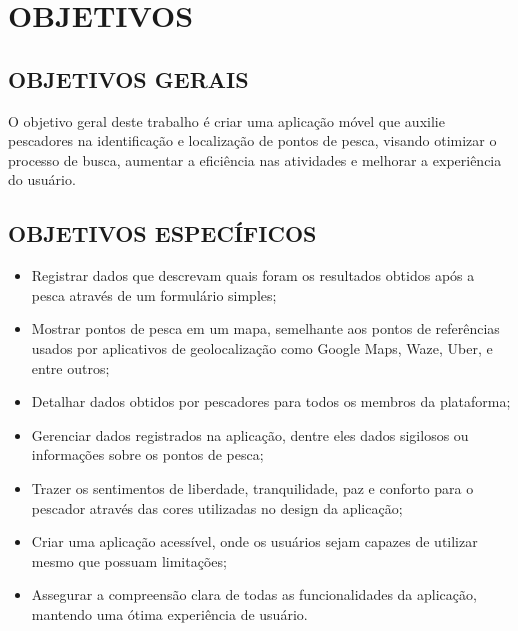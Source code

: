 
\chapter{OBJETIVOS}
\label{chap:objetivos}

\section{OBJETIVOS GERAIS}
\label{sec:objetivosGerais}

O objetivo geral deste trabalho é criar uma aplicação móvel que auxilie pescadores na identificação e localização de pontos de pesca, visando otimizar o processo de busca, aumentar a eficiência nas atividades e melhorar a experiência do usuário.

\section{OBJETIVOS ESPECÍFICOS}
\label{sec:objetivosEspecificos}

\begin{itemize}
  \item Registrar dados que descrevam quais foram os resultados obtidos após a pesca através de um formulário simples;
  \item Mostrar pontos de pesca em um mapa, semelhante aos pontos de referências usados por aplicativos de geolocalização como Google Maps, Waze, Uber, e entre outros;
  \item Detalhar dados obtidos por pescadores para todos os membros da plataforma;
  \item Gerenciar dados registrados na aplicação, dentre eles dados sigilosos ou informações sobre os pontos de pesca;
  \item Trazer os sentimentos de liberdade, tranquilidade, paz e conforto para o pescador através das cores utilizadas no design da aplicação;
  \item Criar uma aplicação acessível, onde os usuários sejam capazes de utilizar mesmo que possuam limitações;
  \item Assegurar a compreensão clara de todas as funcionalidades da aplicação, mantendo uma ótima experiência de usuário. 
\end{itemize}